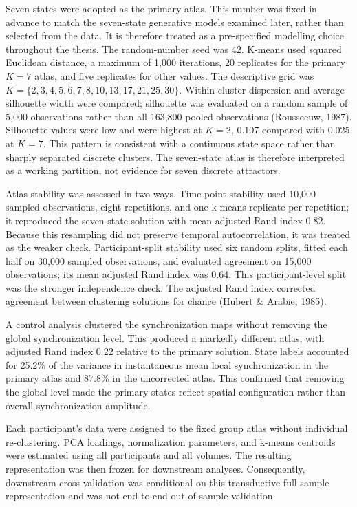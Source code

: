 \documentclass[12pt,a4paper]{report}
\begin{document}
Seven states were adopted as the primary atlas. This number was fixed in advance to match the seven-state generative models examined later, rather than selected from the data. It is therefore treated as a pre-specified modelling choice throughout the thesis. The random-number seed was 42. K-means used squared Euclidean distance, a maximum of 1,000 iterations, 20 replicates for the primary $K=7$ atlas, and five replicates for other values. The descriptive grid was $K=\{2,3,4,5,6,7,8,10,13,17,21,25,30\}$. Within-cluster dispersion and average silhouette width were compared; silhouette was evaluated on a random sample of 5,000 observations rather than all 163,800 pooled observations (Rousseeuw, 1987). Silhouette values were low and were highest at $K=2$, 0.107 compared with 0.025 at $K=7$. This pattern is consistent with a continuous state space rather than sharply separated discrete clusters. The seven-state atlas is therefore interpreted as a working partition, not evidence for seven discrete attractors.

Atlas stability was assessed in two ways. Time-point stability used 10,000 sampled observations, eight repetitions, and one k-means replicate per repetition; it reproduced the seven-state solution with mean adjusted Rand index 0.82. Because this resampling did not preserve temporal autocorrelation, it was treated as the weaker check. Participant-split stability used six random splits, fitted each half on 30,000 sampled observations, and evaluated agreement on 15,000 observations; its mean adjusted Rand index was 0.64. This participant-level split was the stronger independence check. The adjusted Rand index corrected agreement between clustering solutions for chance (Hubert \& Arabie, 1985).

A control analysis clustered the synchronization maps without removing the global synchronization level. This produced a markedly different atlas, with adjusted Rand index 0.22 relative to the primary solution. State labels accounted for 25.2\% of the variance in instantaneous mean local synchronization in the primary atlas and 87.8\% in the uncorrected atlas. This confirmed that removing the global level made the primary states reflect spatial configuration rather than overall synchronization amplitude.

Each participant's data were assigned to the fixed group atlas without individual re-clustering. PCA loadings, normalization parameters, and k-means centroids were estimated using all participants and all volumes. The resulting representation was then frozen for downstream analyses. Consequently, downstream cross-validation was conditional on this transductive full-sample representation and was not end-to-end out-of-sample validation.
\end{document}
